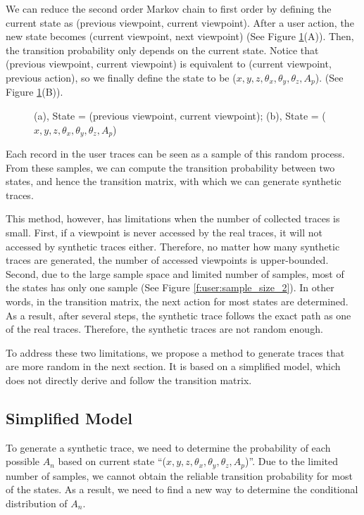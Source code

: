 We can reduce the second order Markov chain to first order by defining the current state as
(previous viewpoint, current viewpoint). After a user action, the new state becomes 
(current viewpoint, next viewpoint) (See Figure \ref{f:user:reduction}(A)). 
Then, the transition probability only depends on the current state.
Notice that (previous viewpoint, current viewpoint) is equivalent to (current viewpoint, previous action), 
so we finally define the state to be ($x, y, z, \theta_x, \theta_y, \theta_z, A_p$). 
(See Figure \ref{f:user:reduction}(B)).
\begin{figure}
    \centering
    \caption{(a), State = (previous viewpoint, current viewpoint); (b), State = ($x, y, z, \theta_x, \theta_y, \theta_z, A_p$)}
    \label{f:user:reduction}
\end{figure}

Each record in the user traces can be seen as a sample of this random process.
From these samples, we can compute the transition probability between two states, and hence
the transition matrix, with which we can generate synthetic traces.

This method, however, has limitations when the number of collected traces is small. First, if a viewpoint is 
never accessed by the real traces, it will not accessed by synthetic traces either. Therefore, no matter how
many synthetic traces are generated, the number of accessed viewpoints is upper-bounded. 
Second, due to the large sample space and limited number of samples, most of the states has only one sample
(See Figure \ref{f:user:sample_size_2}). 
In other words, in the transition matrix, the next action for most states are determined. 
As a result, after several steps, the synthetic trace follows the exact path as one of the real traces. Therefore, the synthetic traces are not random enough.

To address these two limitations, we propose a method to generate traces that are more random in the next section.
It is based on a simplified model, which does not directly derive and follow the transition matrix.

\subsection{Simplified Model}
To generate a synthetic trace, we need to determine the probability of each possible $A_n$ based on current
state ``($x,y,z,\theta_x,\theta_y,\theta_z,A_p$)''. Due to the limited number of samples, we cannot obtain the reliable
transition probability for most of the states. As a result, we need to find a new way to determine the 
conditional distribution of $A_n$.

